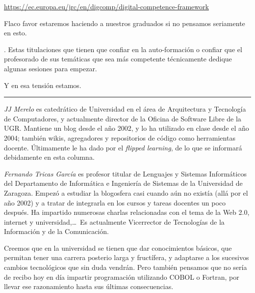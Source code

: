 \documentclass[twoside,10pt]{article}
\newcounter{num}
\begin{document}
\begin{multicols}{2}
{\url{https://ec.europa.eu/jrc/en/digcomp/digital-competence-framework}
	
Flaco favor estaremos haciendo a nuestros graduados si no pensamos seriamente en esto.}. 
Estas titulaciones que tienen que confiar en la auto-formación o confiar que el
profesorado de sus temáticas que sea más competente técnicamente dedique
algunas sesiones para empezar.

Y en esa tensión estamos.

\noindent\rule{86mm}{1pt}
\vspace{1ex} {\small{\begin{window} 
\noindent\emph{JJ Merelo} es catedrático de Universidad
en el área de Arquitectura y Tecnología de Computadores, y
actualmente director de la Oficina de Software Libre de la UGR.
Mantiene un blog desde el año 2002, y lo ha utilizado en clase desde
el año 2004; también wikis, agregadores y repositorios de código
como herramientas docente. Últimamente le ha dado por el \textsl{flipped
learning}, de lo que se informará debidamente en esta columna.
\end{window}}}

\medskip

{\small{\begin{window}
		\noindent \emph{Fernando Tricas García} es profesor
		titular de Lenguajes y Sistemas Informáticos del Departamento
		de Informática e Ingeniería de Sistemas de la Universidad de
		Zaragoza.  Empezó a estudiar la blogosfera casi cuando aún no
		existía (allá por el año 2002) y a tratar de integrarla en los
		cursos y tareas docentes un poco después.  Ha impartido
		numerosas charlas relacionadas con el tema de la Web 2.0, 
		internet y universidad,\ldots\ 
		Es actualmente Vicerrector de Tecnologías de la Información y
de la Comunicación.   
		\end{window}}}




\noindent 
\bigskip

Creemos que en la universidad se tienen que dar conocimientos básicos,
que permitan tener una carrera posterio larga y fructífera, y
adaptarse a los sucesivos cambios tecnológicos que sin duda vendrán. 
Pero también pensamos que no sería de recibo hoy en día
impartir programación utilizando COBOL o Fortran, por llevar
ese razonamiento hasta sus últimas consecuencias. 



\end{multicols}
\end{document}
